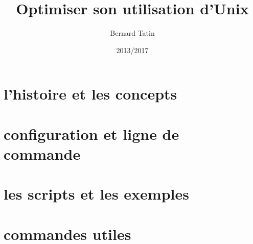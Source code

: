 \documentclass[12pt,book]{bt}
\author{Bernard Tatin}
\date{2013/2017}
\title{Optimiser son utilisation d'Unix}
\begin{document}
\maketitle
\part{l'histoire et les concepts}



\part{configuration et ligne de commande}


\part{les scripts et les exemples}


\part{commandes utiles}


\printindex
\end{document}
